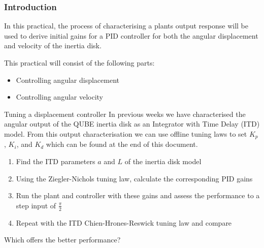 \documentclass[9pt]{beamer-control}
\begin{document}

\begin{frame}
\frametitle{Introduction}
In this practical, the process of characterising a plants output response will be used to derive initial gains for a PID controller for both the angular displacement and velocity of the inertia disk.

\vfill

This practical will consist of the following parts:
\begin{itemize}
\item Controlling angular displacement
\item Controlling angular velocity
\end{itemize}
\end{frame}




\begin{frame}{Tuning a displacement controller}
In previous weeks we have characterised the angular output of the QUBE inertia disk as an Integrator with Time Delay (ITD) model. From this output characterisation we can use offline tuning laws to set $K_p$, $K_i$, and $K_d$ which can be found at the end of this document.

\begin{enumerate}
\item Find the ITD parameters $a$ and $L$ of the inertia disk model 
\item Using the Ziegler-Nichols tuning law, calculate the corresponding PID gains
\item Run the plant and controller with these gains and assess the performance to a step input of $\tfrac{\pi}{2}$
\item Repeat with the ITD Chien-Hrones-Reswick tuning law and compare
\end{enumerate}

Which offers the better performance?


\end{frame}




\end{document}
